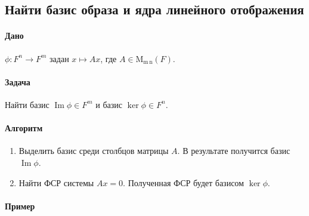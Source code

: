 \documentclass{article}
\newcommand{\MatrixDim}[3]{\operatorname{\mathrm{M}_{#2\,#3}}(#1)}
\renewcommand{\Im}{\operatorname{Im}}
\begin{document}
\subsection{Найти базис образа и ядра линейного отображения}

\paragraph{Дано}

$\phi\colon F^{n}\to F^{m}$ задан $x\mapsto Ax$, где $A\in\MatrixDim{F}{m}{n}$.

\paragraph{Задача}

Найти базис $\Im \phi\in F^{m}$ и базис $\ker \phi\in F^{n}$.

\paragraph{Алгоритм}

\begin{enumerate}
\item Выделить базис среди столбцов матрицы $A$.
В результате получится базис $\Im \phi$.

\item Найти ФСР системы $Ax = 0$.
Полученная ФСР будет базисом $\ker \phi$.
\end{enumerate}

\paragraph{Пример}
\end{document}
